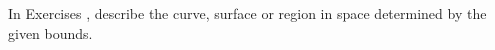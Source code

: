 {\noindent In Exercises} 
{,  describe the curve, surface or region in space determined by the given bounds.
}
